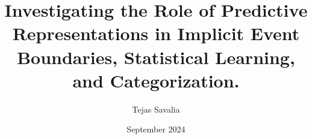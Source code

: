 
\usepackage{xcolor}
\usepackage{float}
\usepackage{amsmath}
\usepackage[hidelinks]{hyperref}
\usepackage{graphicx}
\usepackage{booktabs}
\usepackage{multirow}
\usepackage{soul}

\usepackage[style=apa, backend=biber]{biblatex}


\newcommand{\ac}[1]{\textcolor{cyan}{#1}}
\newcommand{\js}[1]{\textcolor{magenta}{#1}}
\newcommand{\yk}[1]{\textcolor{brown}{#1}}
\newcommand{\mh}[1]{\textcolor{orange}{#1}}



% 


	
\title{Investigating the Role of Predictive Representations in Implicit Event Boundaries, Statistical Learning, and Categorization.}
\author{Tejas Savalia}
\date{September 2024} %


